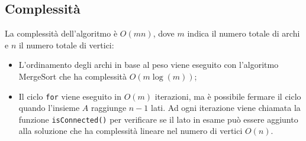 \subsection{Complessità}
	La complessità dell'algoritmo è $O(mn)$, dove $m$ indica il numero totale di archi e $n$ il numero totale di vertici:
	\begin{itemize}
		\item L'ordinamento degli archi in base al peso viene eseguito con l'algoritmo MergeSort che ha complessità $O(m\log(m))$;
		\item Il ciclo \texttt{for} viene eseguito in $O(m)$ iterazioni, ma è possibile fermare il ciclo quando l'insieme $A$ raggiunge $n-1$ lati. 
		Ad ogni iterazione viene chiamata la funzione \texttt{isConnected()} per verificare se il lato in esame può essere aggiunto alla soluzione che ha complessità lineare nel numero di vertici $O(n)$.
	\end{itemize}

\pagebreak